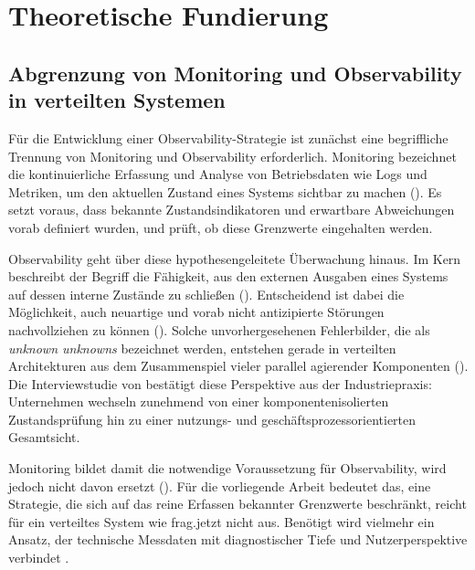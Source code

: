  
\chapter{Theoretische Fundierung}
 
\section{Abgrenzung von Monitoring und Observability in verteilten Systemen}
 
Für die Entwicklung einer Observability-Strategie ist zunächst eine begriffliche Trennung von Monitoring und Observability erforderlich. Monitoring bezeichnet die kontinuierliche Erfassung und Analyse von Betriebsdaten wie Logs und Metriken, um den aktuellen Zustand eines Systems sichtbar zu machen (\cite[S.~86907]{usman2022survey}). Es setzt voraus, dass bekannte Zustandsindikatoren und erwartbare Abweichungen vorab definiert wurden, und prüft, ob diese Grenzwerte eingehalten werden.
 
Observability geht über diese hypothesengeleitete Überwachung hinaus. Im Kern beschreibt der Begriff die Fähigkeit, aus den externen Ausgaben eines Systems auf dessen interne Zustände zu schließen (\cite[S.~86907]{usman2022survey}). Entscheidend ist dabei die Möglichkeit, auch neuartige und vorab nicht antizipierte Störungen nachvollziehen zu können (\cite[S.~272]{abieba2025advanced}). Solche unvorhergesehenen Fehlerbilder, die als \emph{unknown unknowns} bezeichnet werden, entstehen gerade in verteilten Architekturen aus dem Zusammenspiel vieler parallel agierender Komponenten (\cite[S.~916]{banerjee2025comparative}). Die Interviewstudie von \textcite[S.~11]{Niedermaier2019onObservability} bestätigt diese Perspektive aus der Industriepraxis: Unternehmen wechseln zunehmend von einer komponentenisolierten Zustandsprüfung hin zu einer nutzungs- und geschäftsprozessorientierten Gesamtsicht.
 
Monitoring bildet damit die notwendige Voraussetzung für Observability, wird jedoch nicht davon ersetzt (\cite[S.~86907]{usman2022survey}). Für die vorliegende Arbeit bedeutet das, eine Strategie, die sich auf das reine Erfassen bekannter Grenzwerte beschränkt, reicht für ein verteiltes System wie frag.jetzt nicht aus. Benötigt wird vielmehr ein Ansatz, der technische Messdaten mit diagnostischer Tiefe und Nutzerperspektive verbindet \parencite[S.~602]{hallur2024monitoring}.
 
